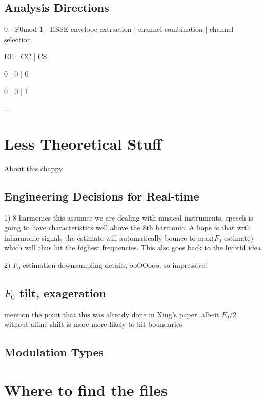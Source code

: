 \documentclass [11pt, proquest] {uwthesis}[2015/03/03]
\begin{document}
\section{Analysis Directions}

0 - F0mod
1 - HSSE
envelope extraction | channel combination | channel selection

EE | CC | CS

0 | 0 | 0 

0 | 0 | 1

...


 
\chapter{Less Theoretical Stuff}

About this chappy

\section{Engineering Decisions for Real-time}

1) 8 harmonics
this assumes we are dealing with musical instruments, speech is going to have characteristics well above the 8th harmonic.  A hope is that with inharmonic signals the estimate will automatically bounce to max($F_0$ estimate) which will thus hit the highest frequencies.  This also goes back to the hybrid idea


2) $F_0$ estimation downsampling details, ooOOooo, so impressive!

\section{$F_0$ tilt, exageration}

mention the point that this was already done in Xing's paper, albeit $F_0/2$ without affine shift is more more likely to hit boundaries 

\section{Modulation Types}


%
%
\nocite{*}   %


%
%
\appendix
\raggedbottom\sloppy
 
 
\chapter{Where to find the files}
 
\end{document}
